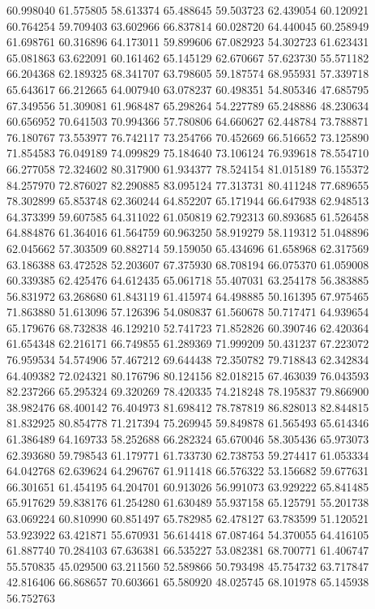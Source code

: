 60.998040
61.575805
58.613374
65.488645
59.503723
62.439054
60.120921
60.764254
59.709403
63.602966
66.837814
60.028720
64.440045
60.258949
61.698761
60.316896
64.173011
59.899606
67.082923
54.302723
61.623431
65.081863
63.622091
60.161462
65.145129
62.670667
57.623730
55.571182
66.204368
62.189325
68.341707
63.798605
59.187574
68.955931
57.339718
65.643617
66.212665
64.007940
63.078237
60.498351
54.805346
47.685795
67.349556
51.309081
61.968487
65.298264
54.227789
65.248886
48.230634
60.656952
70.641503
70.994366
57.780806
64.660627
62.448784
73.788871
76.180767
73.553977
76.742117
73.254766
70.452669
66.516652
73.125890
71.854583
76.049189
74.099829
75.184640
73.106124
76.939618
78.554710
66.277058
72.324602
80.317900
61.934377
78.524154
81.015189
76.155372
84.257970
72.876027
82.290885
83.095124
77.313731
80.411248
77.689655
78.302899
65.853748
62.360244
64.852207
65.171944
66.647938
62.948513
64.373399
59.607585
64.311022
61.050819
62.792313
60.893685
61.526458
64.884876
61.364016
61.564759
60.963250
58.919279
58.119312
51.048896
62.045662
57.303509
60.882714
59.159050
65.434696
61.658968
62.317569
63.186388
63.472528
52.203607
67.375930
68.708194
66.075370
61.059008
60.339385
62.425476
64.612435
65.061718
55.407031
63.254178
56.383885
56.831972
63.268680
61.843119
61.415974
64.498885
50.161395
67.975465
71.863880
51.613096
57.126396
54.080837
61.560678
50.717471
64.939654
65.179676
68.732838
46.129210
52.741723
71.852826
60.390746
62.420364
61.654348
62.216171
66.749855
61.289369
71.999209
50.431237
67.223072
76.959534
54.574906
57.467212
69.644438
72.350782
79.718843
62.342834
64.409382
72.024321
80.176796
80.124156
82.018215
67.463039
76.043593
82.237266
65.295324
69.320269
78.420335
74.218248
78.195837
79.866900
38.982476
68.400142
76.404973
81.698412
78.787819
86.828013
82.844815
81.832925
80.854778
71.217394
75.269945
59.849878
61.565493
65.614346
61.386489
64.169733
58.252688
66.282324
65.670046
58.305436
65.973073
62.393680
59.798543
61.179771
61.733730
62.738753
59.274417
61.053334
64.042768
62.639624
64.296767
61.911418
66.576322
53.156682
59.677631
66.301651
61.454195
64.204701
60.913026
56.991073
63.929222
65.841485
65.917629
59.838176
61.254280
61.630489
55.937158
65.125791
55.201738
63.069224
60.810990
60.851497
65.782985
62.478127
63.783599
51.120521
53.923922
63.421871
55.670931
56.614418
67.087464
54.370055
64.416105
61.887740
70.284103
67.636381
66.535227
53.082381
68.700771
61.406747
55.570835
45.029500
63.211560
52.589866
50.793498
45.754732
63.717847
42.816406
66.868657
70.603661
65.580920
48.025745
68.101978
65.145938
56.752763
